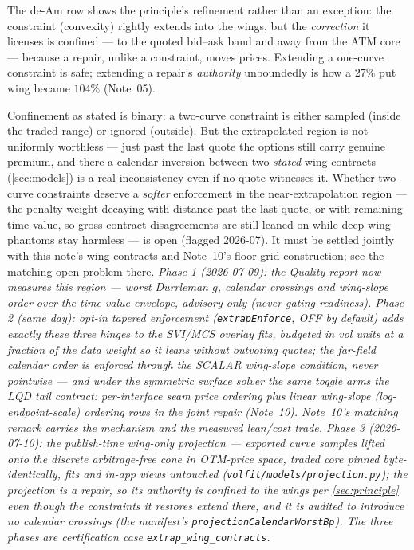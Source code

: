 \documentclass[11pt]{article}
\begin{document}
The de-Am row shows the principle's refinement rather than an exception: the
constraint (convexity) rightly extends into the wings, but the
\emph{correction} it licenses is confined --- to the quoted bid--ask band and
away from the ATM core --- because a repair, unlike a constraint, moves
prices. Extending a one-curve constraint is safe; extending a repair's
\emph{authority} unboundedly is how a $27\%$ put wing became $104\%$
(Note~05).

\begin{remark}
\label{rem:softwings}
Confinement as stated is binary: a two-curve constraint is either sampled
(inside the traded range) or ignored (outside). But the extrapolated region
is not uniformly worthless --- just past the last quote the options still
carry genuine premium, and there a calendar inversion between two
\emph{stated} wing contracts (\cref{sec:models}) is a real inconsistency
even if no quote witnesses it. Whether two-curve constraints deserve a
\emph{softer} enforcement in the near-extrapolation region --- the penalty
weight decaying with distance past the last quote, or with remaining time
value, so gross contract disagreements are still leaned on while deep-wing
phantoms stay harmless --- is open (flagged 2026-07). It must be settled
jointly with this note's wing contracts and Note~10's floor-grid
construction; see the matching open problem there. \emph{Phase 1 (2026-07-09):
the Quality report now measures this region --- worst Durrleman $g$, calendar
crossings and wing-slope order over the time-value envelope, advisory only
(never gating readiness). Phase 2 (same day): opt-in tapered enforcement
(\texttt{extrapEnforce}, OFF by default) adds exactly these three hinges to
the SVI/MCS overlay fits, budgeted in vol units at a fraction of the data
weight so it leans without outvoting quotes; the far-field calendar order is
enforced through the SCALAR wing-slope condition, never pointwise --- and
under the symmetric surface solver the same toggle arms the LQD \emph{tail
contract}: per-interface seam price ordering plus linear wing-slope
(log-endpoint-scale) ordering rows in the joint repair (Note~10). Note~10's
matching remark carries the mechanism and the measured lean/cost trade.
Phase 3 (2026-07-10): the publish-time wing-only projection --- exported
curve samples lifted onto the discrete arbitrage-free cone in OTM-price
space, traded core pinned byte-identically, fits and in-app views untouched
(\nolinkurl{volfit/models/projection.py}); the projection is a repair, so
its \emph{authority} is confined to the wings per \cref{sec:principle} even
though the constraints it restores extend there, and it is audited to
introduce no calendar crossings (the manifest's
\texttt{projectionCalendarWorstBp}). The three phases are certification case
\texttt{extrap\_wing\_contracts}.}
\end{remark}
\end{document}
